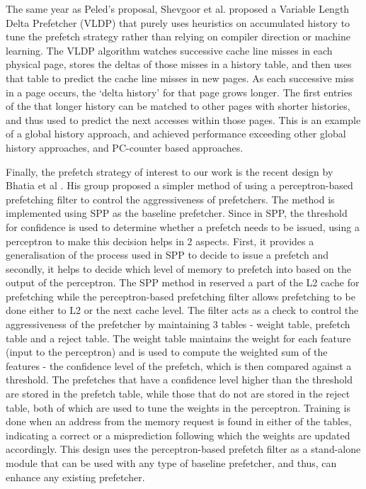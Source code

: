 \documentclass[conference]{IEEEtran}
\begin{document}
The same year as Peled's proposal, Shevgoor et al. proposed a Variable Length Delta Prefetcher (VLDP) \cite{VLDP} that purely uses heuristics on accumulated history to tune the prefetch strategy rather than relying on compiler direction or machine learning. The VLDP algorithm watches successive cache line misses in each physical page, stores the deltas of those misses in a history table, and then uses that table to predict the cache line misses in new pages. As each successive miss in a page occurs, the `delta history' for that page grows longer. The first entries of the that longer history can be matched to other pages with shorter histories, and thus used to predict the next accesses within those pages. This is an example of a global history approach, and achieved performance exceeding other global history approaches, and PC-counter based approaches.

Finally, the prefetch strategy of interest to our work is the recent design by Bhatia et al \cite{ppf}. His group proposed a simpler method of using a perceptron-based prefetching filter to control the aggressiveness of prefetchers. The method is implemented using SPP\cite{SPP} as the baseline prefetcher. Since in SPP, the threshold for confidence is used to determine whether a prefetch needs to be issued, using a perceptron to make this decision helps in 2 aspects. First, it provides a generalisation of the process used in SPP to decide to issue a prefetch and secondly, it helps to decide which level of memory to prefetch into based on the output of the perceptron. The SPP method in \cite{SPP} reserved a part of the L2 cache for prefetching while the perceptron-based prefetching filter allows prefetching to be done either to L2 or the next cache level. The filter acts as a check to control the aggressiveness of the prefetcher by maintaining 3 tables - weight table, prefetch table and a reject table. The weight table maintains the weight for each feature (input to the perceptron) and is used to compute the weighted sum of the features - the confidence level of the prefetch, which is then compared against a threshold. The prefetches that have a confidence level higher than the threshold are stored in the prefetch table, while those that do not are stored in the reject table, both of which are used to tune the weights in the perceptron. Training is done when an address from the memory request is found in either of the tables, indicating a correct or a misprediction following which the weights are updated accordingly. This design uses the perceptron-based prefetch filter as a stand-alone module that can be used with any type of baseline prefetcher, and thus, can enhance any existing prefetcher. 
\end{document}
